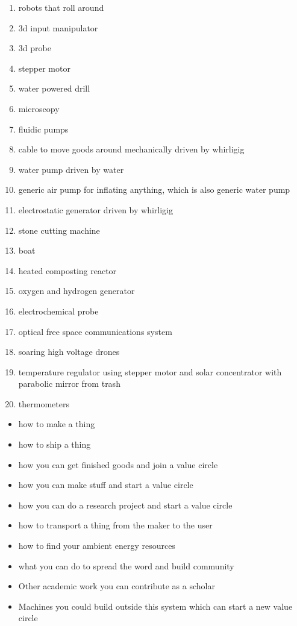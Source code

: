 \begin{enumerate}
\def\labelenumi{\arabic{enumi}.}
\tightlist
\item
  robots that roll around
\item
  3d input manipulator
\item
  3d probe
\item
  stepper motor
\item
  water powered drill
\item
  microscopy
\item
  fluidic pumps
\item
  cable to move goods around mechanically driven by whirligig
\item
  water pump driven by water
\item
  generic air pump for inflating anything, which is also generic water
  pump
\item
  electrostatic generator driven by whirligig
\item
  stone cutting machine
\item
  boat
\item
  heated composting reactor
\item
  oxygen and hydrogen generator
\item
  electrochemical probe
\item
  optical free space communications system
\item
  soaring high voltage drones
\item
  temperature regulator using stepper motor and solar concentrator with
  parabolic mirror from trash
\item
  thermometers
\end{enumerate}

\begin{itemize}
\tightlist
\item
  how to make a thing
\item
  how to ship a thing
\item
  how you can get finished goods and join a value circle
\item
  how you can make stuff and start a value circle
\item
  how you can do a research project and start a value circle
\item
  how to transport a thing from the maker to the user
\item
  how to find your ambient energy resources
\item
  what you can do to spread the word and build community
\item
  Other academic work you can contribute as a scholar
\item
  Machines you could build outside this system which can start a new
  value circle
\end{itemize}


